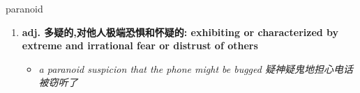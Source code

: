 
\begin{frame}
{\huge paranoid}
\begin{center}
\begin{enumerate}\Large
  \item \textbf{adj. 多疑的,对他人极端恐惧和怀疑的: exhibiting or characterized by extreme and irrational fear or distrust of others}
  \begin{itemize}
    \item \em{\Large{a paranoid suspicion that the phone might be bugged 疑神疑鬼地担心电话被窃听了}}
  \end{itemize}
\end{enumerate}
\end{center}
\end{frame}
